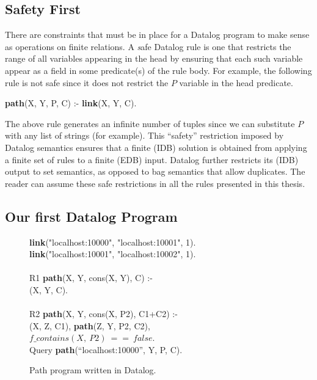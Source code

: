 \subsection{Safety First}

There are constraints that must be in place for a Datalog program to make sense
as operations on finite relations.  A {\emph safe} Datalog rule is one that
restricts the range of all variables appearing in the head by ensuring that
each such variable appear as a field in some predicate(s) of the rule body.
For example, the following rule is not safe since it does not restrict the $P$
variable in the  head predicate.

\begin{minipage}{\linewidth}
\ssp
{\bf path}(X, Y, P, C) :- {\bf link}(X, Y, C). \\
\end{minipage}
The above rule generates an infinite number of  tuples since we can
substitute $P$ with any list of strings (for example).  This ``safety''
restriction imposed by Datalog semantics ensures that a finite (IDB) solution is
obtained from applying a finite set of rules to a finite (EDB) input.  Datalog
further restricts its (IDB) output to set semantics, as opposed to bag
semantics that allow duplicates.  The reader can assume these safe restrictions
in all the rules presented in this thesis.

\subsection{Our first Datalog Program}

\begin{figure}
\ssp
\begin{boxedminipage}{\linewidth}
{\bf link}("localhost:10000", "localhost:10001", 1). \\
{\bf link}("localhost:10001", "localhost:10002", 1). \\
\\
R1 {\bf path}(X, Y, cons(X, Y), C) :- \\
(X, Y, C). \\
\\       
R2 {\bf path}(X, Y, cons(X, P2), C1+C2) :- \\
(X, Z, C1), {\bf path}(Z, Y, P2, C2), \\
\datalogspace $f\_contains(X,\ P2)\ ==\ false$. \\

Query {\bf path}(``localhost:10000'', Y, P, C).
\end{boxedminipage}
\caption{\label{ch:p2:fig:datalogPath}Path program written in Datalog.}
\end{figure}

